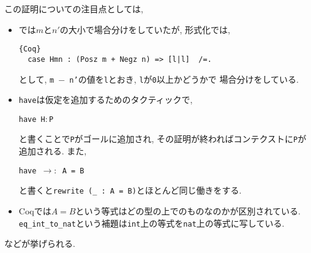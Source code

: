 \documentclass[11pt]{jsreport}
\theoremstyle{mystyle}
\newcommand{\0}{\textbf{0}}
\newcommand{\1}{\textbf{1}}
\newcommand{\2}{\textbf{2}}
\begin{document}
この証明についての注目点としては, 
\begin{itemize}
  \item \cite{Kac}では$m$と$n'$の大小で場合分けをしていたが, 形式化では, 
           \begin{lstlisting}{Coq}
  case Hmn : (Posz m + Negz n) => [l|l]  /=. \end{lstlisting}
           として, {\tt m $-$ n'}の値を{\tt l}とおき, {\tt l}が{\tt 0}以上かどうかで
           場合分けをしている. 
  \item {\tt have}は仮定を追加するためのタクティックで, 
  
    {\tt have H$\colon$P}
    
    と書くことで{\tt P}がゴールに追加され, その証明が終わればコンテクストに{\tt P}が追加される. 
    また, 
    
    {\tt have $\to \colon$ A = B}
    
    と書くと{\tt rewrite (\_ : A = B)}とほとんど同じ働きをする. 
  \item Coqでは$A = B$という等式はどの型の上でのものなのかが区別されている. 
           {\tt eq\_int\_to\_nat}という補題は{\tt int}上の等式を{\tt nat}上の等式に写している. 
\end{itemize}
などが挙げられる. 
\end{document}

